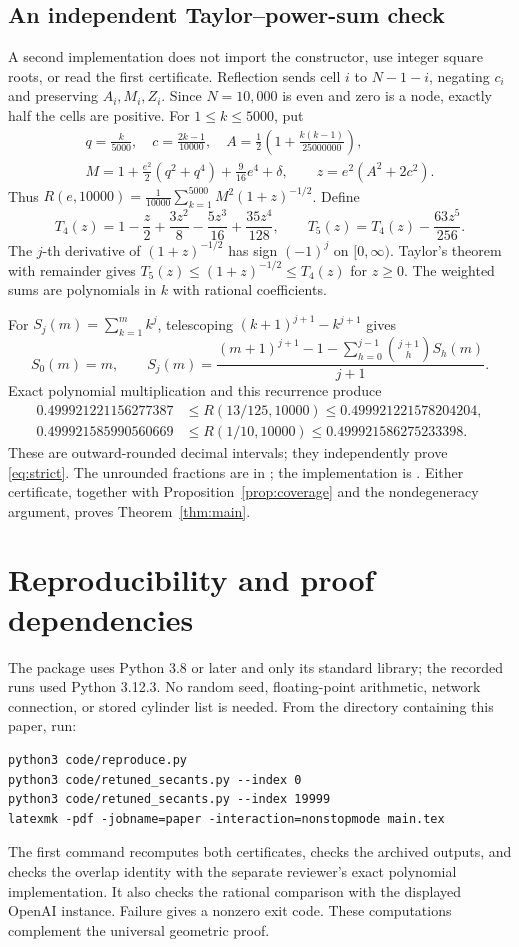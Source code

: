 \documentclass[11pt]{article}
\begin{document}
\subsection{An independent Taylor--power-sum check}
A second implementation does not import the constructor, use integer
square roots, or read the first certificate.
Reflection sends cell \(i\) to \(N-1-i\), negating \(c_i\) and preserving
\(A_i,M_i,Z_i\). Since \(N=10{,}000\) is even and zero is a node, exactly
half the cells are positive. For \(1\le k\le5000\), put
\begin{gather*}
 q=\frac{k}{5000},\quad c=\frac{2k-1}{10000},\quad
 A=\frac12\left(1+\frac{k(k-1)}{25000000}\right),\\
 M=1+\frac{e^2}{2}(q^2+q^4)+\frac9{16}e^4+\delta,\qquad
 z=e^2(A^2+2c^2).
\end{gather*}
Thus \(R(e,10000)=\frac1{10000}\sum_{k=1}^{5000}M^2(1+z)^{-1/2}\).
Define
\[
 T_4(z)=1-\frac z2+\frac{3z^2}{8}-\frac{5z^3}{16}+\frac{35z^4}{128},
 \qquad T_5(z)=T_4(z)-\frac{63z^5}{256}.
\]
The \(j\)-th derivative of \((1+z)^{-1/2}\) has sign \((-1)^j\) on
\([0,\infty)\). Taylor's theorem with remainder gives
\(T_5(z)\le(1+z)^{-1/2}\le T_4(z)\) for \(z\ge0\).
The weighted sums are polynomials in \(k\) with rational coefficients.

For \(S_j(m)=\sum_{k=1}^m k^j\), telescoping
\((k+1)^{j+1}-k^{j+1}\) gives
\[
 S_0(m)=m,\qquad
 S_j(m)=\frac{(m+1)^{j+1}-1-
 \sum_{h=0}^{j-1}\binom{j+1}{h}S_h(m)}{j+1}.
\]
Exact polynomial multiplication and this recurrence produce
\begin{align*}
 0.499921221156277387&\le R(13/125,10000)\le0.499921221578204204,\\
 0.499921585990560669&\le R(1/10,10000)\le0.499921586275233398.
\end{align*}
These are outward-rounded decimal intervals; they independently prove
\eqref{eq:strict}. The unrounded fractions are in
; the implementation is
.
Either certificate, together with Proposition~\ref{prop:coverage} and
the nondegeneracy argument, proves Theorem~\ref{thm:main}.

\section{Reproducibility and proof dependencies}\label{sec:reproduce}
The package uses Python 3.8 or later and only its standard library;
the recorded runs used Python 3.12.3. No random seed, floating-point
arithmetic, network connection, or stored cylinder list is needed.
From the directory containing this paper, run:
\begin{verbatim}
python3 code/reproduce.py
python3 code/retuned_secants.py --index 0
python3 code/retuned_secants.py --index 19999
latexmk -pdf -jobname=paper -interaction=nonstopmode main.tex
\end{verbatim}
The first command recomputes both certificates, checks the archived
outputs, and checks the overlap identity with the separate reviewer's
exact polynomial implementation. It also checks the rational comparison
with the displayed OpenAI instance. Failure gives a nonzero exit code.
These computations complement the universal geometric proof.
\end{document}
